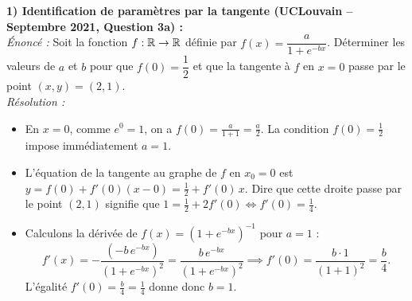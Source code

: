 \begin{exemple}
\textbf{1) Identification de paramètres par la tangente (UCLouvain -- Septembre 2021, Question 3a) :}\\
\emph{Énoncé :} Soit la fonction $f : \mathbb{R} \to \mathbb{R}$ définie par $f(x) = \dfrac{a}{1 + e^{-bx}}$. Déterminer les valeurs de $a$ et $b$ pour que $f(0) = \dfrac{1}{2}$ et que la tangente à $f$ en $x = 0$ passe par le point $(x, y) = (2, 1)$.\\
\emph{Résolution :}
\begin{itemize}
    \item En $x = 0$, comme $e^0 = 1$, on a $f(0) = \frac{a}{1+1} = \frac{a}{2}$. La condition $f(0) = \frac{1}{2}$ impose immédiatement $\boxed{a = 1}$.
    \item L'équation de la tangente au graphe de $f$ en $x_0 = 0$ est $y = f(0) + f'(0)(x - 0) = \frac{1}{2} + f'(0)\,x$. Dire que cette droite passe par le point $(2, 1)$ signifie que $1 = \frac{1}{2} + 2f'(0) \iff f'(0) = \frac{1}{4}$.
    \item Calculons la dérivée de $f(x) = (1 + e^{-bx})^{-1}$ pour $a = 1$ :
    \[
        f'(x) = -\frac{(-b\,e^{-bx})}{(1 + e^{-bx})^2} = \frac{b\,e^{-bx}}{(1 + e^{-bx})^2} \implies f'(0) = \frac{b \cdot 1}{(1+1)^2} = \frac{b}{4}.
    \]
    L'égalité $f'(0) = \frac{b}{4} = \frac{1}{4}$ donne donc $\boxed{b = 1}$.
\end{itemize}


\end{exemple}
